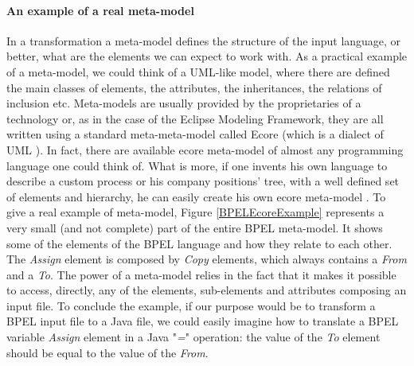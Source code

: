 \paragraph{An example of a real meta-model}
\label{metamodelExample}
In a transformation a meta-model defines the structure of the input language, or better, what are the elements we can expect to work with. As a practical example of a meta-model, we could think of a UML-like model, where there are defined the main classes of elements, the attributes, the inheritances, the relations of inclusion etc. Meta-models are usually provided by the proprietaries of a technology or, as in the case of the Eclipse Modeling Framework, they are all written using a standard meta-meta-model called Ecore (which is a dialect of UML \cite{EcoreAPI}). In fact, there are available ecore meta-model of almost any programming language one could think of. What is more, if one invents his own language to describe a custom process or his company positions' tree, with a well defined set of elements and hierarchy, he can easily create his own ecore meta-model \cite{EcoreExample}.
To give a real example of meta-model, Figure \ref{BPELEcoreExample} represents a very small (and not complete) part of the entire BPEL meta-model. It shows some of the elements of the BPEL language and how they relate to each other. The \textit{Assign} element is composed by \textit{Copy} elements, which always contains a \textit{From} and a \textit{To}. The power of a meta-model relies in the fact that it makes it possible to access, directly, any of the elements, sub-elements and attributes  composing an input file. To conclude the example, if our purpose would be to transform a BPEL input file to a Java file, we could easily imagine how to translate a BPEL variable \textit{Assign} element in a Java "\textit{=}" operation: the value of the \textit{To} element should be equal to the value of the \textit{From}. 


